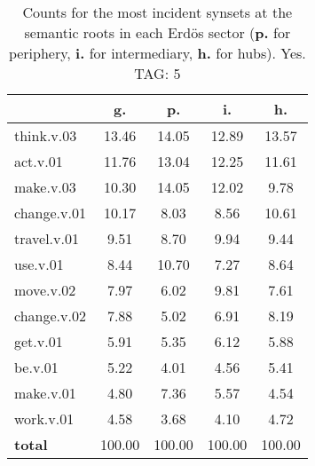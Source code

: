 \begin{table}[h!]
\begin{center}
\begin{tabular}{| l | c | c | c | c |}\hline
 & g. & p. & i. & h. \\\hline
think.v.03 & 13.46  & 14.05  & 12.89  & 13.57 \\\hline
act.v.01 & 11.76  & 13.04  & 12.25  & 11.61 \\\hline
make.v.03 & 10.30  & 14.05  & 12.02  & 9.78 \\\hline
change.v.01 & 10.17  & 8.03  & 8.56  & 10.61 \\\hline
travel.v.01 & 9.51  & 8.70  & 9.94  & 9.44 \\\hline
use.v.01 & 8.44  & 10.70  & 7.27  & 8.64 \\\hline
move.v.02 & 7.97  & 6.02  & 9.81  & 7.61 \\\hline
change.v.02 & 7.88  & 5.02  & 6.91  & 8.19 \\\hline
get.v.01 & 5.91  & 5.35  & 6.12  & 5.88 \\\hline
be.v.01 & 5.22  & 4.01  & 4.56  & 5.41 \\\hline
make.v.01 & 4.80  & 7.36  & 5.57  & 4.54 \\\hline
work.v.01 & 4.58  & 3.68  & 4.10  & 4.72 \\\hline
{{\bf total}} & 100.00  & 100.00  & 100.00  & 100.00 \\\hline
\end{tabular}
\caption{Counts for the most incident synsets at the semantic roots in each Erd\"os sector ({\bf p.} for periphery, {\bf i.} for intermediary, {\bf h.} for hubs). Yes. TAG: 5}
\end{center}
\end{table}